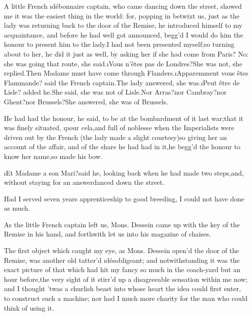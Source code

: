 \documentclass[twoside]{article}
\begin{document}
A little French \i{débonnaire} captain, who came dancing down the street,
showed me it was the easiest thing in the world: for, popping in betwixt
us, just as the lady was returning back to the door of the Remise, he
introduced himself to my acquaintance, and before he had well got
announced, begg’d I would do him the honour to present him to the lady.\tsk I
had not been presented myself;\tsk so turning about to her, he did it just as
well, by asking her if she had come from Paris?  No: she was going that
route, she said.\tsk \i{Vous n’êtes pas de Londres}?\tsk She was not, she
replied.\tsk Then Madame must have come through Flanders.\tsk \i{Apparemment vous
êtes Flammande}? said the French captain.\tsk The lady answered, she
was.\tsk \i{Peut être de Lisle}? added he.\tsk She said, she was not of Lisle.\tsk Nor
Arras?\tsk nor Cambray?\tsk nor Ghent?\tsk nor Brussels?\tsk She answered, she was of
Brussels.

He had had the honour, he said, to be at the bombardment of it last
war;\tsk that it was finely situated, \i{pour cela},\tsk and full of noblesse when
the Imperialists were driven out by the French (the lady made a slight
courtesy)\tsk so giving her an account of the affair, and of the share he had
had in it,\tsk he begg’d the honour to know her name,\tsk so made his bow.

\tsk \i{Et Madame a son Mari}?\tsk said he, looking back when he had made two
steps,\tsk and, without staying for an answer\tsk danced down the street.

Had I served seven years apprenticeship to good breeding, I could not
have done as much.






As the little French captain left us, Mons. Dessein came up with the key
of the Remise in his hand, and forthwith let us into his magazine of
chaises.

The first object which caught my eye, as Mons. Dessein open’d the door of
the Remise, was another old tatter’d \i{désobligeant}; and notwithstanding
it was the exact picture of that which had hit my fancy so much in the
coach-yard but an hour before,\tsk the very sight of it stirr’d up a
disagreeable sensation within me now; and I thought ’twas a churlish
beast into whose heart the idea could first enter, to construct such a
machine; nor had I much more charity for the man who could think of using
it.
\end{document}
